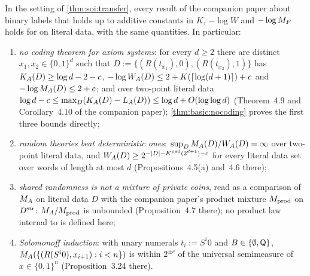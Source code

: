 \begin{corollary}\label{cor:soi:transfer}
In the setting of \cref{thm:soi:transfer}, every result of the companion paper about binary labels that holds up to additive constants in $K$, $-\log W$ and $-\log M_{F}$ holds for \SAIabbr on literal data, with the same quantities. In particular:
\begin{enumerate}[label=(\alph*),leftmargin=*]
\item \emph{no coding theorem for axiom systems}: for every $d\ge2$ there are distinct $x_1,x_2\in\{0,1\}^d$ such that $D:=\{(R(t_{x_1}),0),(R(t_{x_2}),1)\}$ has $K_{A}(D)\ge\log d-2-c$, $-\log W_{A}(D)\le2+K(\lceil\log(d+1)\rceil)+c$ and $-\log M_{A}(D)\le2+c$; and over two-point literal data $\log d-c\le\max_D(K_{A}(D)-L_{A}(D))\le\log d+O(\log\log d)$ (Theorem~4.9 and Corollary~4.10 of the companion paper); \cref{thm:basic:nocoding} proves the first three bounds directly;
\item \emph{random theories beat deterministic ones}: $\sup_DM_{A}(D)/W_{A}(D)=\infty$ over two-point literal data, and $W_{A}(D)\ge2^{-\lvert D\rvert-K^{\mathrm{pad}}(2^{d+1})-c}$ for every literal data set over words of length at most $d$ (Propositions~4.5(a) and~4.6 there);
\item \emph{shared randomness is not a mixture of private coins}, read as a comparison of $M_{A}$ on literal data $D$ with the companion paper's product mixture $M_{\mathrm{prod}}$ on $D^{\rm str}$: $M_{A}/M_{\mathrm{prod}}$ is unbounded (Proposition~4.7 there); no product law internal to \SAIabbr is defined here;
\item \emph{Solomonoff induction}: with unary numerals $t_i:=S^i0$ and $B\in\{\emptyset,\mathsf{Q}\}$, $M_{A}(\{(R(S^i0),x_{i+1}):i<n\})$ is within $2^{\pm c}$ of the universal semimeasure of $x\in\{0,1\}^n$ (Proposition~3.24 there).
\end{enumerate}
\end{corollary}

